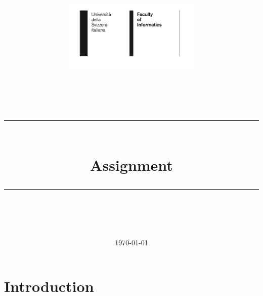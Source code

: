 \documentclass[11pt]{scrartcl}
\title{	
    \vspace{-3cm} 
    \begin{figure}[H]
        \hspace{-2cm}
    	\includegraphics[width=65mm]{usi-inf-logo.png}
    \end{figure}
    \vspace{2cm} 
	\normalfont\large
	\textsc{\thecourse}\\
	\vspace{25pt}
	\rule{\linewidth}{0.5pt}\\
	\vspace{20pt}
	{\huge Assignment \theassnumber}\\
	\vspace{12pt}
	\rule{\linewidth}{0.5pt}\\
	\vspace{12pt}
}
\author{\LARGE \thestudent}
\date{\normalsize\today}
\begin{document}
\maketitle




\newpage
\section{Introduction}

\end{document}

